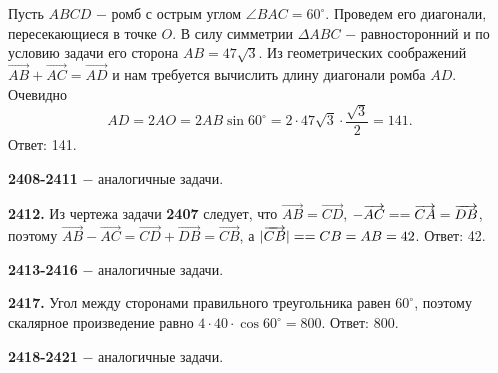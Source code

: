 Пусть $ABCD$ $-$ ромб с острым углом $\angle BAC = 60^\circ$. Проведем его диагонали, пересекающиеся в точке $O$. В силу симметрии $\Delta ABC$ $-$ равносторонний и по условию задачи его сторона $AB=47\sqrt{3}$. Из геометрических соображений $\overrightarrow{AB}+\overrightarrow{AC}=\overrightarrow{AD}$
и нам требуется вычислить длину диагонали ромба $AD$. Очевидно
\[
AD=2AO=2AB\sin{60^\circ}=2\cdot47\sqrt{3}\cdot\frac{\sqrt{3}}{2}=141.
\]  \newline \null \hspace*{\fill} Ответ: 141. 

\textbf{2408-2411} $-$ аналогичные задачи.

\textbf{2412.} Из чертежа задачи \textbf{2407} следует, что $\overrightarrow{AB}=\overrightarrow{CD}$, $-\overrightarrow{AC}=\linebreak=\overrightarrow{CA} = \overrightarrow{DB}$, поэтому $\overrightarrow{AB}-\overrightarrow{AC}=\overrightarrow{CD}+\overrightarrow{DB}=\overrightarrow{CB}$, а $|\overrightarrow{CB}|=\linebreak=CB=AB=42$. \newline \null \hspace*{\fill} Ответ: 42.
 
\textbf{2413-2416} $-$ аналогичные задачи.

\textbf{2417.}  Угол между сторонами правильного треугольника равен $60^\circ$, поэтому скалярное произведение равно $4\cdot40\cdot\cos{60^\circ}=800$. \newline \null \hspace*{\fill} Ответ: 800.

\textbf{2418-2421} $-$ аналогичные задачи.
